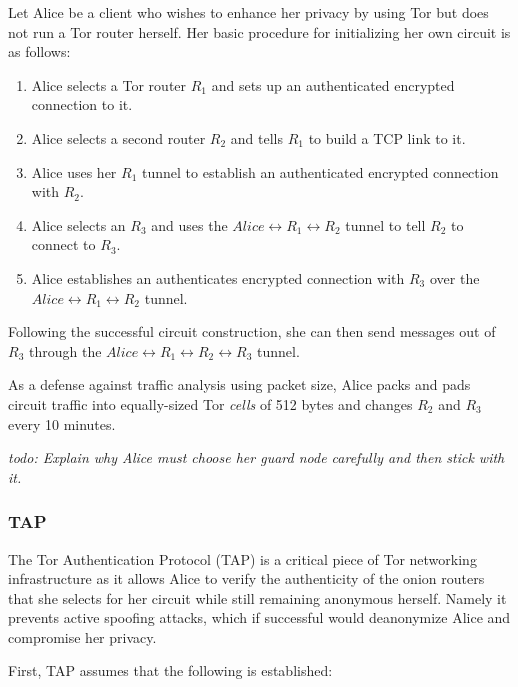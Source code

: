 Let Alice be a client who wishes to enhance her privacy by using Tor but does not run a Tor router herself. Her basic procedure for initializing her own circuit is as follows:

\begin{enumerate}
	\item Alice selects a Tor router $ R_{1} $ and sets up an authenticated encrypted connection to it.
	\item Alice selects a second router $ R_{2} $ and tells $ R_{1} $ to build a TCP link to it. 
	\item Alice uses her $ R_{1} $ tunnel to establish an authenticated encrypted connection with $ R_{2} $.
	\item Alice selects an $ R_{3} $ and uses the $ Alice \leftrightarrow R_{1} \leftrightarrow R_{2} $ tunnel to tell $ R_{2} $ to connect to $ R_{3} $.
	\item Alice establishes an authenticates encrypted connection with $ R_{3} $ over the $ Alice \leftrightarrow R_{1} \leftrightarrow R_{2} $ tunnel.
\end{enumerate}

Following the successful circuit construction, she can then send messages out of $ R_{3} $ through the $ Alice \leftrightarrow R_{1} \leftrightarrow R_{2} \leftrightarrow R_{3} $ tunnel.

As a defense against traffic analysis using packet size, Alice packs and pads circuit traffic into equally-sized Tor \emph{cells} of 512 bytes and changes $ R_{2} $ and $ R_{3} $ every 10 minutes.\cite{mccoy2008shining}

\emph{todo: Explain why Alice must choose her guard node carefully and then stick with it.}

\subsubsection{TAP}

The Tor Authentication Protocol (TAP) is a critical piece of Tor networking infrastructure as it allows Alice to verify the authenticity of the onion routers that she selects for her circuit while still remaining anonymous herself. Namely it prevents active spoofing attacks, which if successful would deanonymize Alice and compromise her privacy.

First, TAP assumes that the following is established:

